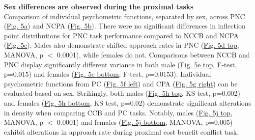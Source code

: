 \documentclass{article}
\begin{document}
\vspace{1em}

\noindent\textbf{Sex differences are observed during the proximal tasks}\\
Comparison of individual psychometric functions, separated by sex, across PNC (\hyperref[fig:alcohol_main_5]{Fig. 5a}) and NCPA (\hyperref[fig:alcohol_main_5]{Fig. 5b}). There were no significant differences in inflection point distributions for PNC task performance compared to NCCB and NCPA (\hyperref[fig:alcohol_main_5]{Fig. 5c}). Males also demonstrate shifted approach rates in PNC (\hyperref[fig:alcohol_main_5]{Fig. 5d top}, MANOVA, p $<$ 0.0001), while females do not. Comparisons between NCCB and PNC display significantly different variance in both male (\hyperref[fig:alcohol_main_5]{Fig. 5e top}, F-test, p=0.015) and females (\hyperref[fig:alcohol_main_5]{Fig. 5e bottom}, F-test, p=0.0153). Individual psychometric functions from PC (\hyperref[fig:alcohol_main_5]{Fig. 5f left}) and CPA (\hyperref[fig:alcohol_main_5]{Fig. 5g right}) can be evaluated based on sex. Strikingly, both males (\hyperref[fig:alcohol_main_5]{Fig. 5h top}, KS test, p=0.002) and females (\hyperref[fig:alcohol_main_5]{Fig. 5h bottom}, KS test, p=0.02) demonstrate significant alterations in density when comparing CCB and PC tasks. Notably, males (\hyperref[fig:alcohol_main_5]{Fig. 5j top}, MANOVA, p $<$ 0.0001) and females (\hyperref[fig:alcohol_main_5]{Fig. 5j bottom}, MANOVA, p=0.005) exhibit alterations in approach rate during proximal cost benefit conflict task.
\end{document}
